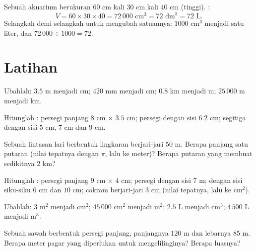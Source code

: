 \begin{example}\label{ex:g6:measure:aquarium}
Sebuah akuarium berukuran $60$ cm kali $30$ cm kali $40$ cm (tinggi). :
\[
V = 60 \times 30 \times 40 = 72\,000 \text{ cm}^3 = 72 \text{ dm}^3
= 72 \text{ L}.
\]
Selangkah demi selangkah untuk mengubah satuannya: $1000$ cm$^3$
menjadi satu liter, dan $72\,000 \div 1000 = 72$.
\end{example}

\section{Latihan}

\begin{exercise}[$\star$]\label{exo:g6:measure:1}
Ubahlah: $3.5$ m menjadi cm; $420$ mm menjadi cm; $0.8$ km menjadi m;
$25\,000$ m menjadi km.
\end{exercise}

\begin{exercise}[$\star$]\label{exo:g6:measure:2}
Hitunglah : persegi panjang $8$ cm $\times$ $3.5$ cm; persegi
dengan sisi $6.2$ cm; segitiga dengan sisi $5$ cm, $7$ cm dan
$9$ cm.
\end{exercise}

\begin{exercise}[$\star$]\label{exo:g6:measure:3}
Sebuah lintasan lari berbentuk lingkaran berjari-jari $50$ m. Berapa
panjang satu putaran (nilai tepatnya dengan $\pi$, lalu  ke
meter)? Berapa putaran yang membuat sedikitnya $2$ km?
\end{exercise}

\begin{exercise}[$\star$]\label{exo:g6:measure:4}
Hitunglah : persegi panjang $9$ cm $\times$ $4$ cm; persegi dengan
sisi $7$ m;  dengan sisi siku-siku $6$ cm dan $10$
cm; cakram berjari-jari $3$ cm (nilai tepatnya, lalu  ke cm$^2$).
\end{exercise}

\begin{exercise}[$\star$]\label{exo:g6:measure:5}
Ubahlah: $3$ m$^2$ menjadi cm$^2$; $45\,000$ cm$^2$ menjadi m$^2$;
$2.5$ L menjadi cm$^3$; $4\,500$ L menjadi m$^3$.
\end{exercise}

\begin{exercise}[$\star$]\label{exo:g6:measure:6}
Sebuah sawah berbentuk persegi panjang, panjangnya $120$ m dan
lebarnya $85$ m. Berapa meter pagar yang diperlukan untuk mengelilinginya? Berapa luasnya?
\end{exercise}

